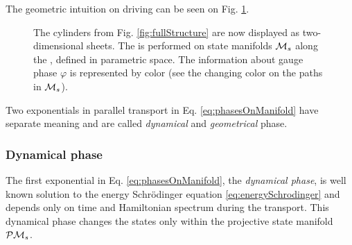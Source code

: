 The geometric intuition on driving can be seen on Fig. \ref{fig:manifoldCutIntuition}.
\begin{figure}[h]
    \centering
\caption{The cylinders from Fig. \ref{fig:fullStructure} are now displayed as two-dimensional sheets. The  is performed on state manifolds $\mathcal{M}_s$ along the , defined in parametric space. The information about gauge phase $\varphi$ is represented by color (see the changing color on the paths in $\mathcal{M}_s$).}
    \label{fig:manifoldCutIntuition}
\end{figure}

Two exponentials in parallel transport in Eq. \ref{eq:phasesOnManifold} have separate meaning and are called \emph{dynamical} and \emph{geometrical} phase.

\subsubsection{Dynamical phase}
The first exponential in Eq. \ref{eq:phasesOnManifold}, the \emph{dynamical phase}, is well known solution to the energy Schr\"odinger equation \ref{eq:energySchrodinger} and depends only on time and Hamiltonian spectrum during the transport. This dynamical phase changes the states only within the projective state manifold $\mathcal{P}\mathcal{M}_s$. 

